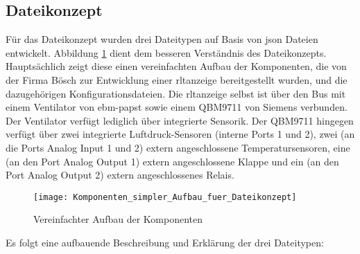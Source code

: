 \subsection{Dateikonzept} \label{json_config_files}
Für das Dateikonzept wurden drei Dateitypen auf Basis von \acs{json} Dateien entwickelt. Abbildung \ref{fig:vereinfachter_aufbau_dateikonzept} dient dem besseren Verständnis des Dateikonzepts. Hauptsächlich zeigt diese einen vereinfachten Aufbau der Komponenten, die von der Firma Bösch zur Entwicklung einer \acs{rltanzeige} bereitgestellt wurden, und die dazugehörigen Konfigurationsdateien. Die \acs{rltanzeige} selbst ist über den Bus mit einem Ventilator von ebm-papst sowie einem QBM9711 von Siemens verbunden. Der Ventilator verfügt lediglich über integrierte Sensorik. Der QBM9711 hingegen verfügt über zwei integrierte Luftdruck-Sensoren (interne Ports 1 und 2), zwei (an die Ports Analog Input 1 und 2) extern angeschlossene Temperatursensoren, eine (an den Port Analog Output 1) extern angeschlossene Klappe und ein (an den Port Analog Output 2) extern angeschlossenes Relais.


\begin{figure}[H]
	\centering
	\texttt{[image: Komponenten\_simpler\_Aufbau\_fuer\_Dateikonzept]}
	\caption{Vereinfachter Aufbau der Komponenten \label{fig:vereinfachter_aufbau_dateikonzept}}
\end{figure}

Es folgt eine aufbauende Beschreibung und Erklärung der drei Dateitypen:

